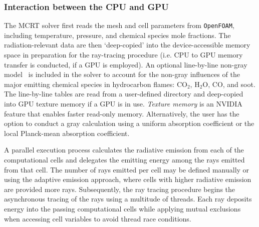 

\subsubsection{Interaction between the CPU and GPU}
The MCRT solver first reads the mesh and cell parameters from \texttt{OpenFOAM}, including temperature, pressure, and chemical species mole fractions. The radiation-relevant data are then `deep-copied' into the device-accessible memory space in preparation for the ray-tracing procedure (i.e. CPU to GPU memory transfer is conducted, if a GPU is employed). An optional line-by-line non-gray model~\cite{Ren2019Line-by-lineSystem} is included in the solver to account for the non-gray influences of the major emitting chemical species in hydrocarbon flames: CO$_2$, H$_2$O, CO, and soot.
The line-by-line tables are read from a user-defined directory and deep-copied into GPU texture memory if a GPU is in use. 
\textit{Texture memory} is an NVIDIA feature that enables faster read-only memory. Alternatively, the user has the option to conduct a gray calculation using a uniform absorption coefficient or the local Planck-mean absorption coefficient. 

A parallel execution process calculates the radiative emission from each of the computational cells and delegates the emitting energy among the rays emitted from that cell. The number of rays emitted per cell may be defined manually or using the adaptive emission approach, where cells with higher radiative emission are provided more rays. Subsequently, the ray tracing procedure begins the asynchronous tracing of the rays using a multitude of threads. Each ray deposits energy into the passing computational cells while applying mutual exclusions when accessing cell variables to avoid thread race conditions. 


